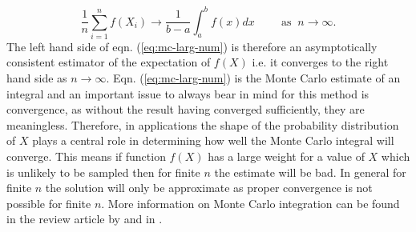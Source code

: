 \begin{equation}
  \label{eq:mc-larg-num}
  \frac{1}{n} \sum_{i=1}^n f(X_i) \rightarrow \frac{1}{b - a}\int_a^b f(x) dx \hspace{1cm}   \text{as } \: n \rightarrow \infty.
\end{equation}
The left hand side of eqn. (\ref{eq:mc-larg-num}) is therefore an asymptotically consistent estimator of the expectation of $f(X)$ i.e. it converges to the right hand side as $n \rightarrow \infty$. Eqn. (\ref{eq:mc-larg-num}) is the Monte Carlo estimate of an integral and an important issue to always bear in mind for this method is convergence, as without the result having converged sufficiently, they are meaningless. Therefore, in applications the shape of the probability distribution of $X$ plays a central role in determining how well the Monte Carlo integral will converge. This means if function $f(X)$ has a large weight for a value of $X$ which is unlikely to be sampled then for finite $n$ the estimate will be bad. In general for finite $n$ the solution will only be approximate as proper convergence is not possible for finite $n$. More information on Monte Carlo integration can be found in the review article by \cite{James:mc}  and in \citet[Chapter~5]{norris1998markov}.

